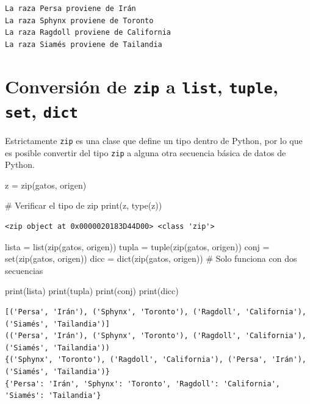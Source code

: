 \documentclass[
  spanish,
  letterpaper,
]{scrbook}
\newenvironment{Shaded}{\begin{snugshade}}{\end{snugshade}}
\newcommand{\BuiltInTok}[1]{\textcolor[rgb]{0.00,0.23,0.31}{#1}}
\newcommand{\CommentTok}[1]{\textcolor[rgb]{0.37,0.37,0.37}{#1}}
\newcommand{\NormalTok}[1]{\textcolor[rgb]{0.00,0.23,0.31}{#1}}
\newcommand{\OperatorTok}[1]{\textcolor[rgb]{0.37,0.37,0.37}{#1}}
\theoremstyle{definition}
\theoremstyle{remark}
\begin{document}
\begin{verbatim}
La raza Persa proviene de Irán
La raza Sphynx proviene de Toronto
La raza Ragdoll proviene de California
La raza Siamés proviene de Tailandia
\end{verbatim}

\section{\texorpdfstring{Conversión de \texttt{zip} a \texttt{list},
\texttt{tuple}, \texttt{set},
\texttt{dict}}{Conversión de zip a list, tuple, set, dict}}\label{conversiuxf3n-de-zip-a-list-tuple-set-dict}

Estrictamente \texttt{zip} es una clase que define un tipo dentro de
Python, por lo que es posible convertir del tipo \texttt{zip} a alguna
otra secuencia básica de datos de Python.

\begin{Shaded}
\begin{Highlighting}[]
\NormalTok{z }\OperatorTok{=} \BuiltInTok{zip}\NormalTok{(gatos, origen)}

\CommentTok{\# Verificar el tipo de zip}
\BuiltInTok{print}\NormalTok{(z, }\BuiltInTok{type}\NormalTok{(z))}
\end{Highlighting}
\end{Shaded}

\begin{verbatim}
<zip object at 0x0000020183D44D00> <class 'zip'>
\end{verbatim}

\begin{Shaded}
\begin{Highlighting}[]
\NormalTok{lista }\OperatorTok{=} \BuiltInTok{list}\NormalTok{(}\BuiltInTok{zip}\NormalTok{(gatos, origen))}
\NormalTok{tupla }\OperatorTok{=} \BuiltInTok{tuple}\NormalTok{(}\BuiltInTok{zip}\NormalTok{(gatos, origen))}
\NormalTok{conj }\OperatorTok{=} \BuiltInTok{set}\NormalTok{(}\BuiltInTok{zip}\NormalTok{(gatos, origen))}
\NormalTok{dicc }\OperatorTok{=} \BuiltInTok{dict}\NormalTok{(}\BuiltInTok{zip}\NormalTok{(gatos, origen)) }\CommentTok{\# Solo funciona con dos secuencias}

\BuiltInTok{print}\NormalTok{(lista)}
\BuiltInTok{print}\NormalTok{(tupla)}
\BuiltInTok{print}\NormalTok{(conj)}
\BuiltInTok{print}\NormalTok{(dicc)}
\end{Highlighting}
\end{Shaded}

\begin{verbatim}
[('Persa', 'Irán'), ('Sphynx', 'Toronto'), ('Ragdoll', 'California'), ('Siamés', 'Tailandia')]
(('Persa', 'Irán'), ('Sphynx', 'Toronto'), ('Ragdoll', 'California'), ('Siamés', 'Tailandia'))
{('Sphynx', 'Toronto'), ('Ragdoll', 'California'), ('Persa', 'Irán'), ('Siamés', 'Tailandia')}
{'Persa': 'Irán', 'Sphynx': 'Toronto', 'Ragdoll': 'California', 'Siamés': 'Tailandia'}
\end{verbatim}
\end{document}
